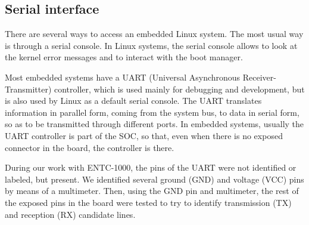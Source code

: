 \documentclass[conference]{IEEEtran}
\newcommand{\nota}[1]{}
\begin{document}
\subsection{Serial interface}
\nota {
Existen varias posibilidades para conectarse a un dispositivo 
Linux embebido, pero una de las disponibles, mas comúnmente encontrada es
a través de una consola serial. En los sistemas Linux, la 
consola serial permite ver los mensajes de error del kernel,
y también interactuar con el gestor de arranque.
}

There are several ways to access an embedded Linux system. The most usual way is through a serial console. In Linux systems, the serial console allows to look at the kernel error messages and to interact with the boot manager.

\nota{ La mayoría de los sistemas embebidos contienen un controlador 
UART (del inglés ``Universal Asynchronous Receiver-Transmitter''),
utilizado principalmente para depuración y desarrollo.
Pero que también es utilizado por Linux como la interfaz serie
predeterminada.
El UART traduce la información en formato paralelo
provenientes del bus del sistema, a datos en formato serie,
para que puedan ser transmitidos a través de diferentes puertos.
En los sistemas embebidos, generalmente, el controlador UART es parte de la CPU,
por lo que, aunque no exista un conector expuesto en la placa, generalmente
está presente.
}

Most embedded systems have a UART (Universal Asynchronous Receiver-Transmitter) controller, which is used mainly for debugging and development, but is also used by Linux as a default serial console.
The UART translates information in parallel form, coming from the system bus, to data in serial form, so as to be transmitted through different ports. In embedded systems, usually the UART controller is part of the SOC, so that, even when there is no exposed connector in the board, the controller is there. 

\nota{
En nuestro trabajo con el ENTC-1000, los contactos (en inglés ``pins'') del UART
no se encontraban identificados o etiquetados, pero estaban presentes.
Utilizando un multímetro y un osciloscopio, se identificaron contactos
de tierra (GND) y de voltaje de corriente directa (VCC). Luego, utilizando
el contacto tierra, se probaron los demás contactos expuestos en la placa,
para identificar el contacto de transmisión (TX), y recepción (RX).
}
During our work with ENTC-1000, the pins of the UART were not identified or labeled, but present. We identified several ground (GND) and voltage (VCC) pins by means of a multimeter. Then, using the GND pin and multimeter, the rest of the exposed pins in the board were tested to try to identify transmission (TX) and reception (RX) candidate lines.
  
\end{document}
